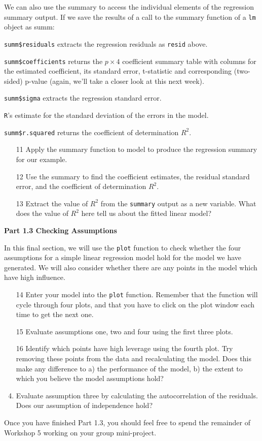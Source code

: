 \documentclass[11pt,a4paper]{article}
\begin{document}
We can also use the summary to access the individual elements of the regression summary output. If we save the results of a call to the summary function of a \texttt{lm} object as summ:

\vspace{0.35cm}

\texttt{summ\$residuals} extracts the regression residuals as \texttt{resid} above.

\texttt{summ\$coefficients} returns the $p\times4$
 coefficient summary table with columns for the estimated coefficient, its standard error, t-statistic and corresponding (two-sided) p-value (again, we'll take a closer look at this next week).
 
\texttt{summ\$sigma} extracts the regression standard error.

\texttt{R}'s estimate for the standard deviation of the errors in the model.

\texttt{summ\$r.squared} returns the coefficient of determination $R^2$.

\begin{enumerate}
\item[11] Apply the summary function to model to produce the regression summary for our example.

\item[12] Use the summary to find the coefficient estimates, the residual standard error, and the coefficient of determination $R^2$.

\item[13] Extract the value of $R^2$ from the \texttt{summary} output as a new variable. What does the value of $R^2$ here tell us about the fitted linear model?
\end{enumerate}

\textbf{Part 1.3 Checking Assumptions}

In this final section, we will use the \texttt{plot} function to check whether the four assumptions for a simple linear regression model hold for the model we have generated. We will also consider whether there are any points in the model which have high influence.

\begin{enumerate}
\item[14] Enter your model into the \texttt{plot} function. Remember that the function will cycle through four plots, and that you have to click on the plot window each time to get the next one.
\item[15] Evaluate assumptions one, two and four using the first three plots.
\item [16] Identify which points have high leverage using the fourth plot. Try removing these points from the data and recalculating the model. Does this make any difference to a) the performance of the model, b) the extent to which you believe the model assumptions hold?
\item Evaluate assumption three by calculating the autocorrelation of the residuals. Does our assumption of independence hold?
\end{enumerate}
 Once you have finished Part 1.3, you should feel free to spend the remainder of Workshop 5 working on your group mini-project.
\end{document}
